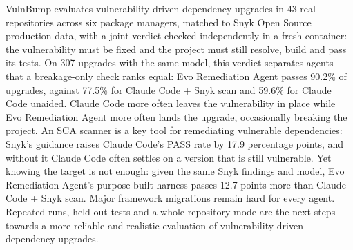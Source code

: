 \documentclass[11pt]{article}
\theoremstyle{definition}
\newcommand{\bench}{VulnBump}
\newcommand{\evo}{Evo Remediation Agent}
\newcommand{\aided}{Claude Code + Snyk scan}
\newcommand{\unaided}{Claude Code unaided}
\begin{document}
\bench{} evaluates vulnerability-driven dependency upgrades in 43 real repositories across six package managers, matched to Snyk Open Source production data, with a joint verdict checked independently in a fresh container: the vulnerability must be fixed and the project must still resolve, build and pass its tests. On 307 upgrades with the same model, this verdict separates agents that a breakage-only check ranks equal: \evo{} passes 90.2\% of upgrades, against 77.5\% for \aided{} and 59.6\% for \unaided{}. Claude Code more often leaves the vulnerability in place while \evo{} more often lands the upgrade, occasionally breaking the project. An SCA scanner is a key tool for remediating vulnerable dependencies: Snyk's guidance raises Claude Code's PASS rate by 17.9 percentage points, and without it Claude Code often settles on a version that is still vulnerable. Yet knowing the target is not enough: given the same Snyk findings and model, \evo{}'s purpose-built harness passes 12.7 points more than \aided{}. Major framework migrations remain hard for every agent. Repeated runs, held-out tests and a whole-repository mode are the next steps towards a more reliable and realistic evaluation of vulnerability-driven dependency upgrades.


\renewcommand{\bibfont}{\raggedright}

\end{document}
